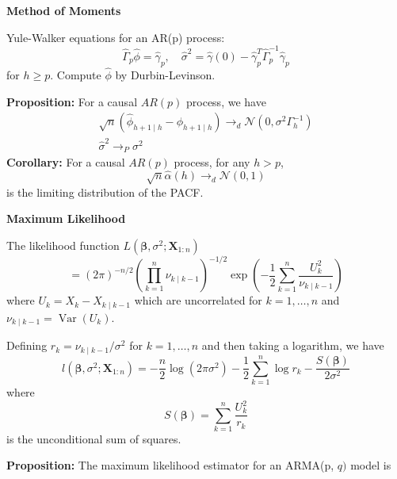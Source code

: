 \documentclass[a4paper]{article}
\newcommand{\subheading}[1]{{\scriptsize\textbf{#1}}}
\begin{document}
\begin{multicols*}{4}
\subheading{Method of Moments}

Yule-Walker equations for an AR(p) process:
$$
\hat{\Gamma}_{p} \hat{\phi}=\hat{\gamma}_{p}, \quad \hat{\sigma}^{2}=\hat{\gamma}(0)-\hat{\gamma}_{p}^{T} \hat{\Gamma}_{p}^{-1} \hat{\gamma}_{p}
$$
for $h \geq p$. Compute $\hat{\phi}$ by Durbin-Levinson.

\textbf{Proposition:} For a causal $A R(p)$ process, we have
$$
\begin{gathered}
\sqrt{n}\left(\hat{\phi}_{h+1 \mid h}-\phi_{h+1 \mid h}\right) \rightarrow_{d} \mathcal{N}\left(0, \sigma^{2} \Gamma_{h}^{-1}\right) \\
\hat{\sigma}^{2} \rightarrow_{P} \sigma^{2}
\end{gathered}
$$
\textbf{Corollary:} For a causal $A R(p)$ process, for any $h>p$,
$$
\sqrt{n} \hat{\alpha}(h) \rightarrow_{d} \mathcal{N}(0,1)
$$
is the limiting distribution of the PACF.

\smallskip
\hline
\smallskip

\subheading{Maximum Likelihood}

The likelihood function $L\left(\boldsymbol{\beta}, \sigma^{2} ; \mathbf{X}_{1: n}\right)$
$$
=(2 \pi)^{-n / 2}\left(\prod_{k=1}^{n} \nu_{k \mid k-1}\right)^{-1/2} \exp \left(-\frac{1}{2} \sum_{k=1}^{n} \frac{U_{k}^{2}}{\nu_{k \mid k-1}}\right)
$$
where $U_{k}=X_{k}-\hat{X}_{k \mid k-1}$ which are uncorrelated for $k=1, \ldots, n$ and $\nu_{k \mid k-1}=\operatorname{Var}\left(U_{k}\right)$.

Defining $r_{k}=\nu_{k \mid k-1} / \sigma^{2}$ for $k=1, \ldots, n$ and then taking a logarithm, we have
$$
l\left(\boldsymbol{\beta}, \sigma^{2} ; \mathbf{X}_{1: n}\right)=-\frac{n}{2} \log \left(2 \pi \sigma^{2}\right)-\frac{1}{2} \sum_{k=1}^{n} \log r_{k}-\frac{S(\boldsymbol{\beta})}{2 \sigma^{2}}
$$
where
$$
S(\boldsymbol{\beta})=\sum_{k=1}^{n} \frac{U_{k}^{2}}{r_{k}}
$$
is the unconditional sum of squares. 

\textbf{Proposition:} The maximum likelihood estimator for an ARMA(p, $q)$ model is


\end{multicols*}
\end{document}

